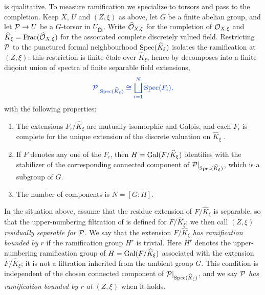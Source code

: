 \documentclass[11pt]{report}
\newcommand{\new}[1]{\textcolor{newmath}{#1}}
\newenvironment{proposed}%
  {\par\medskip\noindent{\small\textbf{Proposed:}}\par\nopagebreak
   \begin{leftbar}}%
  {\end{leftbar}\medskip}
\begin{document}
\begin{proposed}
\new{ is qualitative. To measure
ramification we specialize to torsors and pass to the completion. Keep $X$, $U$
and $(Z,\xi)$ as above, let $G$ be a finite abelian group, and let
$\mathcal{P}\to U$ be a $G$-torsor in $U_{\text{\'Et}}$. Write $\widehat{\mathcal{O}}_{X,\xi}$
for the completion of $\mathcal{O}_{X,\xi}$ and
$\widehat{K}_\xi=\operatorname{Frac}(\widehat{\mathcal{O}}_{X,\xi})$ for the associated complete
discretely valued field. Restricting $\mathcal{P}$ to the punctured formal
neighbourhood $\operatorname{Spec}(\widehat{K}_\xi)$ isolates the ramification at $(Z,\xi)$:
this restriction is finite \'etale over $\widehat{K}_\xi$, hence by
\stackstag{02GL} decomposes into a finite disjoint union of spectra of finite
separable field extensions,}
\[
    \new{\cP|_{\Spec(\widehat{K}_\xi)}\cong\bigsqcup_{i=1}^{N}\Spec(F_i),}
\]
\new{with the following properties:}
\begin{enumerate}\color{newmath}
    \item The extensions $F_i/\widehat{K}_\xi$ are mutually isomorphic and
    Galois, and each $F_i$ is complete for the unique extension of the discrete
    valuation on $\widehat{K}_\xi$
    \cite[Chapter~II, \S 2, Proposition~3]{serreLF}.
    \item If $F$ denotes any one of the $F_i$, then
    $H=\operatorname{Gal}(F/\widehat{K}_\xi)$ identifies with the stabilizer of the
    corresponding connected component of $\mathcal{P}|_{\operatorname{Spec}(\widehat{K}_\xi)}$, which
    is a subgroup of $G$.
    \item The number of components is $N=[G:H]$.
\end{enumerate}

\begin{definition}\label{definition:local_ramification_boundness}
\color{newmath}
    In the situation above, assume that the residue extension of
    $F/\widehat{K}_\xi$ is separable, so that the upper-numbering filtration of
     is defined for
    $F/\widehat{K}_\xi$; we then call $(Z,\xi)$ \emph{residually separable for
    $\mathcal{P}$}. We say that the extension $F/\widehat{K}_\xi$ \textit{has
    ramification bounded by $r$} if the ramification group $H^r$ is trivial.
    Here $H^r$ denotes the upper-numbering ramification group of
    $H=\operatorname{Gal}(F/\widehat{K}_\xi)$ associated with the extension
    $F/\widehat{K}_\xi$; it is not a filtration inherited from the ambient
    group $G$. This condition is independent of the chosen connected component
    of $\mathcal{P}|_{\operatorname{Spec}(\widehat{K}_\xi)}$, and we say \textit{$\mathcal{P}$ has
    ramification bounded by $r$ at $(Z,\xi)$} when it holds.
\end{definition}


\end{proposed}
\end{document}
